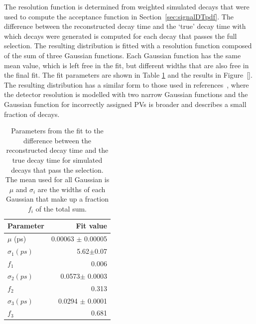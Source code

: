 The resolution function is determined from weighted simulated \bsmumu decays that were used to compute the acceptance function in Section~\ref{sec:signalDTpdf}. The difference between the reconstructed decay time and the `true' decay time with which decays were generated is computed for each decay that passes the full selection. The resulting distribution is fitted with a resolution function composed of the sum of three Gaussian functions. Each Gaussian function has the same mean value, which is left free in the fit, but different widths that are also free in the final fit. The fit parameters are shown in Table \ref{tab:resolutionfit} and the results in Figure~\ref{}. %
The resulting distribution has a similar form to those used in references~\cite{Aaij:2016ohx,Aaij:2015vza}, where the detector resolution is modelled with two narrow Gaussian functions and the Gaussian function for incorrectly assigned PVs is broader and describes a small fraction of decays.


\begin{table}[ht]
\begin{center}
\begin{tabular}{lr}
\toprule \toprule
Parameter               & Fit value             \\ \midrule
$\mu$ (ps)              & 0.00063 $\pm$ 0.00005 \\ \midrule
$\sigma_{1} (ps)$       & 5.62$\pm$0.07         \\ 
$f_{1}$                 & 0.006               \\ \midrule
$\sigma_{2} (ps)$       & 0.0573$\pm$ 0.0003    \\ 
$f_{2}$                 & 0.313                \\ \midrule
$\sigma_{3} (ps)$       & 0.0294 $\pm$ 0.0001   \\ 
$f_{3}$                 & 0.681                \\ \bottomrule \bottomrule
\end{tabular}
\vspace{0.7cm}                                                                                    
\caption{Parameters from the fit to the difference between the reconstructed decay time and the true decay time for simulated decays that pass the \bsmumu \el selection. The mean used for all Gaussian is $\mu$ and $\sigma_{i}$ are the widths of each Gaussian that make up a fraction $f_{i}$ of the total sum.}
\label{tab:resolutionfit}
\end{center}
\vspace{-1.0cm}                                                                                   
\end{table}

